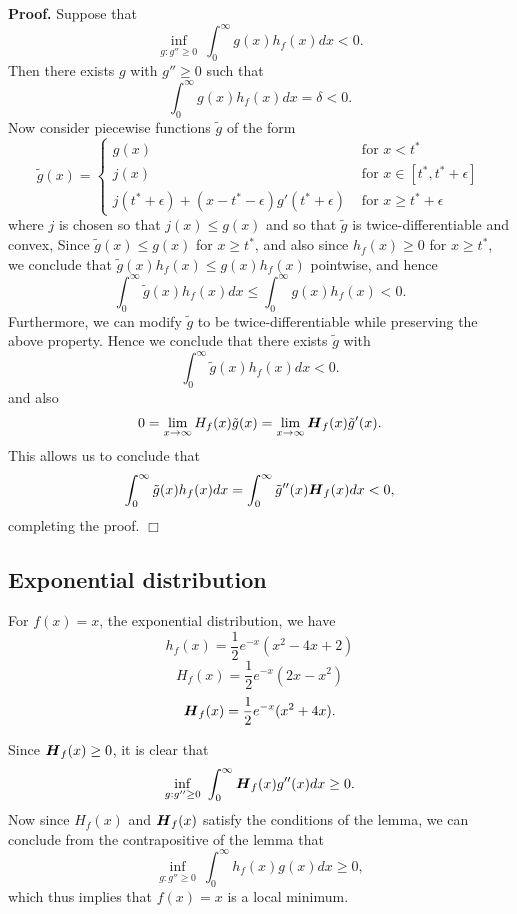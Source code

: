 \documentclass[11pt]{article}
\begin{document}
\noindent \textbf{Proof.}  
Suppose that
\[
\inf_{g: g'' \geq 0}\ \int_0^\infty g(x) h_f(x) dx < 0.
\]
Then there exists $g$ with $g'' \geq 0$ such that
\[
\int_0^\infty g(x) h_f(x) dx  = \delta < 0.
\]
Now consider piecewise functions $\tilde{g}$ of the form
\[
\tilde{g}(x) = \begin{cases}
g(x) &\text{ for } x < t^*\\
j(x) &\text{ for } x \in [t^*, t^* + \epsilon]\\
j(t^* + \epsilon) + (x-t^*-\epsilon)g'(t^* + \epsilon) &\text{ for }x \geq t^* + \epsilon
\end{cases}
\]
where $j$ is chosen so that $j(x) \leq g(x)$ and so that $\tilde{g}$ is twice-differentiable and convex,
Since $\tilde{g}(x) \leq g(x)$ for $x \geq t^*$,
and also since $h_f(x) \geq 0$ for $x \geq t^*$,
we conclude that $\tilde{g}(x) h_f(x) \leq g(x) h_f(x)$ pointwise,
and hence
\[
\int_0^\infty \tilde{g}(x) h_f(x) dx \leq \int_0^\infty g(x) h_f(x) < 0.
\]
Furthermore, we can modify $\tilde{g}$ to be twice-differentiable while preserving the above property.
Hence we conclude that there exists
$\tilde{g}$ with
\[
\int_0^\infty \tilde{g}(x) h_f(x) dx  < 0.
\]
and also
\[
0 = \lim_{x \to \infty} H_f(x) \tilde{g}(x) = \lim_{x \to \infty} \boldsymbol{H}_f(x) \tilde{g}'(x).
\]
This allows us to conclude that
\[
\int_0^\infty \tilde{g}(x) h_f(x) dx = \int_0^\infty \tilde{g}''(x) \boldsymbol{H}_f(x) dx < 0,
\]
completing the proof. $\Box$

\subsection{Exponential distribution}

For $f(x) = x$, the exponential distribution, we have
\[
h_f(x) = \frac{1}{2}e^{-x}(x^2 - 4x + 2)
\]
\[
H_f(x) = \frac{1}{2}e^{-x}(2x-x^2)
\]
\[
\boldsymbol{H}_f(x) = \frac{1}{2}e^{-x}(x^2 + 4x).
\]

Since $\boldsymbol{H}_f(x) \geq 0$, it is clear that
\[
\inf_{g: g'' \geq 0}\ \int_0^\infty \boldsymbol{H}_f(x) g''(x) dx \geq 0.
\]
Now since $H_f(x)$ and $\boldsymbol{H}_f(x)$ satisfy the conditions of the lemma, we can conclude from the contrapositive of the lemma that
\[
\inf_{g: g'' \geq 0}\ \int_0^\infty h_f(x) g(x) dx \geq 0,
\]
which thus implies that $f(x) = x$ is a local minimum.
\end{document}
